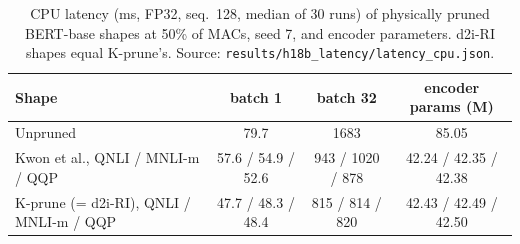 \documentclass[11pt]{article}
\begin{document}
\begin{table}[t]\centering\small
\caption{CPU latency (ms, FP32, seq.\ 128, median of 30 runs) of physically pruned BERT-base shapes at 50\% of MACs, seed 7, and encoder parameters. d2i-RI shapes equal K-prune's. Source:
\texttt{results/h18b\_latency/latency\_cpu.json}.}\label{tab:lat}
\begin{tabular}{lccc}\toprule
Shape & batch 1 & batch 32 & encoder params (M)\\\midrule
Unpruned & 79.7 & 1683 & 85.05\\
Kwon et al., QNLI / MNLI-m / QQP & 57.6 / 54.9 / 52.6 & 943 / 1020 / 878 & 42.24 / 42.35 / 42.38\\
K-prune (= d2i-RI), QNLI / MNLI-m / QQP & 47.7 / 48.3 / 48.4 & 815 / 814 / 820 & 42.43 / 42.49 / 42.50\\\bottomrule
\end{tabular}\end{table}
\end{document}
